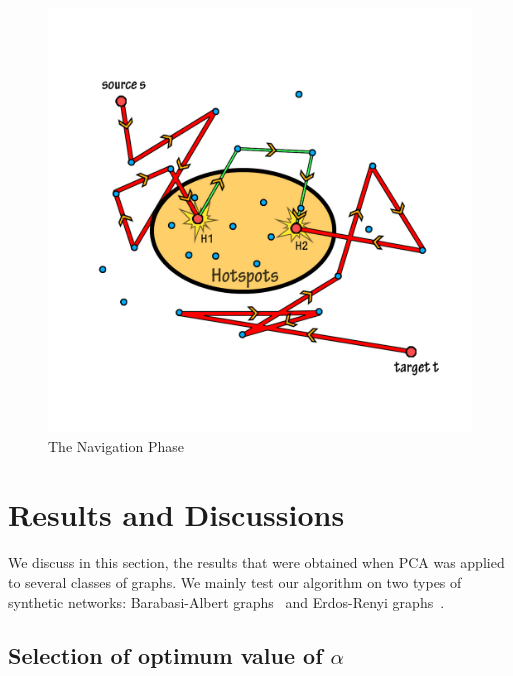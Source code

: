 \documentclass[10pt, conference, compsocconf]{IEEEtran}
\begin{document}
\begin{figure}[htp]
\centering
\includegraphics[scale=0.15]{Results/greedywalk.jpg}
\caption{The Navigation Phase}
\label{4_navigation_phase}
\end{figure}

\section{\label{4_results}Results and Discussions}

We discuss in this section, the results that were obtained when PCA was applied to several classes of graphs. We mainly test our algorithm on two types of synthetic networks: Barabasi-Albert graphs~\cite{barabasi02} and Erdos-Renyi graphs~\cite{erdos60}.\\

\subsection{Selection of optimum value of $\alpha$}
\end{document}
